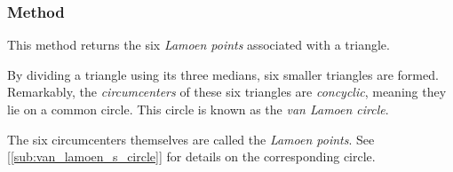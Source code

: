 \begin{minipage}{.5\textwidth}
\end{minipage}
\begin{minipage}{.5\textwidth}
\begin{tkzexample}
\end{tkzexample}
\end{minipage}


\subsubsection{Method } %
\label{ssub:method_triangle_lamoen_points}

This method returns the six \emph{Lamoen points} associated with a triangle.

By dividing a triangle using its three medians, six smaller triangles are formed. Remarkably, the \emph{circumcenters} of these six triangles are \emph{concyclic}, meaning they lie on a common circle. This circle is known as the \emph{van Lamoen circle}.

The six circumcenters themselves are called the \emph{Lamoen points}. See  [\ref{sub:van_lamoen_s_circle}] for details on the corresponding circle.

\vspace{1em}

